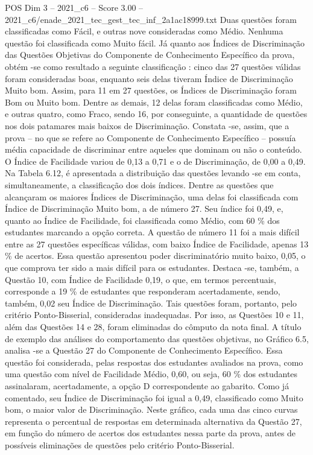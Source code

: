 \begin{textsample}{POS Dim 3 – 2021\_c6 – Score 3.00 – 2021\_c6/enade\_2021\_tec\_gest\_tec\_inf\_2a1ac18999.txt}
Duas questões foram classificadas como Fácil, e outras nove consideradas como Médio.
Nenhuma questão foi classificada como Muito fácil.
Já quanto aos Índices de Discriminação das Questões Objetivas do Componente de Conhecimento Específico da prova, obtém -se como resultado a seguinte classificação : cinco das 27 questões válidas foram consideradas boas, enquanto seis delas tiveram Índice de Discriminação Muito bom.
Assim, para 11 em 27 questões, os Índices de Discriminação foram Bom ou Muito bom.
Dentre as demais, 12 delas foram classificadas como Médio, e outras quatro, como Fraco, sendo 16, por conseguinte, a quantidade de questões nos dois patamares mais baixos de Discriminação.
Constata -se, assim, que a prova – no que se refere ao Componente de Conhecimento Específico – possuía média capacidade de discriminar entre aqueles que dominam ou não o conteúdo.
O Índice de Facilidade variou de 0,13 a 0,71 e o de Discriminação, de 0,00 a 0,49.
Na Tabela 6.12, é apresentada a distribuição das questões levando -se em conta, simultaneamente, a classificação dos dois índices.
Dentre as questões que alcançaram os maiores Índices de Discriminação, uma delas foi classificada com Índice de Discriminação Muito bom, a de número 27.
Seu índice foi 0,49, e, quanto ao Índice de Facilidade, foi classificada como Médio, com 60 \% dos estudantes marcando a opção correta.
A questão de número 11 foi a mais difícil entre as 27 questões específicas válidas, com baixo Índice de Facilidade, apenas 13 \% de acertos.
Essa questão apresentou poder discriminatório muito baixo, 0,05, o que comprova ter sido a mais difícil para os estudantes.
Destaca -se, também, a Questão 10, com Índice de Facilidade 0,19, o que, em termos percentuais, corresponde a 19 \% de estudantes que responderam acertadamente, sendo, também, 0,02 seu Índice de Discriminação.
Tais questões foram, portanto, pelo critério Ponto-Bisserial, consideradas inadequadas.
Por isso, as Questões 10 e 11, além das Questões 14 e 28, foram eliminadas do cômputo da nota final.
A título de exemplo das análises do comportamento das questões objetivas, no Gráfico 6.5, analisa -se a Questão 27 do Componente de Conhecimento Específico.
Essa questão foi considerada, pelas respostas dos estudantes avaliados na prova, como uma questão com nível de Facilidade Médio, 0,60, ou seja, 60 \% dos estudantes assinalaram, acertadamente, a opção D correspondente ao gabarito.
Como já comentado, seu Índice de Discriminação foi igual a 0,49, classificado como Muito bom, o maior valor de Discriminação.
Neste gráfico, cada uma das cinco curvas representa o percentual de respostas em determinada alternativa da Questão 27, em função do número de acertos dos estudantes nessa parte da prova, antes de possíveis eliminações de questões pelo critério Ponto-Bisserial.

\end{textsample}
